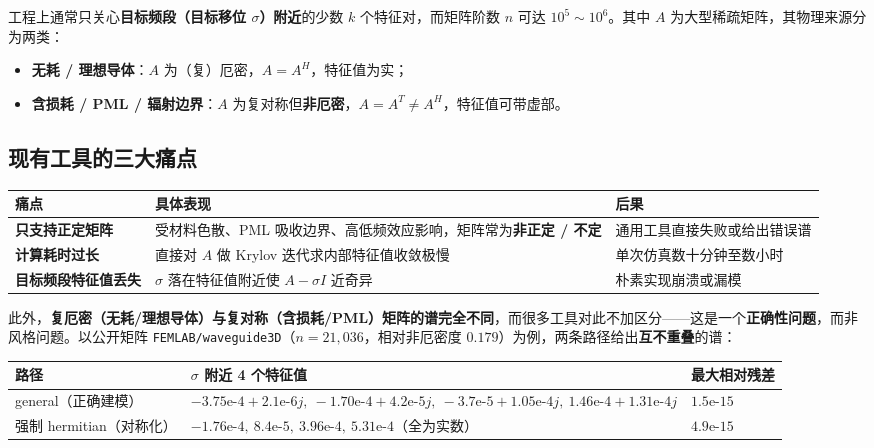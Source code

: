\documentclass[11pt,a4paper]{ctexart}
\newcommand{\code}[1]{\texttt{\small #1}}
\begin{document}
工程上通常只关心\textbf{目标频段（目标移位 $\sigma$）附近}的少数 $k$ 个特征对，而矩阵阶数 $n$ 可达 $10^5 \sim 10^6$。其中 $A$ 为大型稀疏矩阵，其物理来源分为两类：

\begin{itemize}
  \item \textbf{无耗 / 理想导体}：$A$ 为（复）厄密，$A = A^{H}$，特征值为实；
  \item \textbf{含损耗 / PML / 辐射边界}：$A$ 为复对称但\textbf{非厄密}，$A = A^{T} \neq A^{H}$，特征值可带虚部。
\end{itemize}

\subsection{现有工具的三大痛点}

\begin{table}[h]
\centering\small
\renewcommand{\arraystretch}{1.25}
\begin{tabularx}{\textwidth}{@{}>{\bfseries}p{3.4cm} X X@{}}
\toprule
痛点 & 具体表现 & 后果 \\
\midrule
只支持正定矩阵 & 受材料色散、PML 吸收边界、高低频效应影响，矩阵常为\textbf{非正定 / 不定} & 通用工具直接失败或给出错误谱 \\
计算耗时过长 & 直接对 $A$ 做 Krylov 迭代求内部特征值收敛极慢 & 单次仿真数十分钟至数小时 \\
目标频段特征值丢失 & $\sigma$ 落在特征值附近使 $A-\sigma I$ 近奇异 & 朴素实现崩溃或漏模 \\
\bottomrule
\end{tabularx}
\end{table}

此外，\textbf{复厄密（无耗/理想导体）与复对称（含损耗/PML）矩阵的谱完全不同}，而很多工具对此不加区分——这是一个\textbf{正确性问题}，而非风格问题。以公开矩阵 \code{FEMLAB/waveguide3D}（$n = 21{,}036$，相对非厄密度 $0.179$）为例，两条路径给出\textbf{互不重叠}的谱：

\begin{table}[h]
\centering\small
\renewcommand{\arraystretch}{1.25}
\begin{tabular}{@{}p{3.0cm} p{9.6cm} p{2.6cm}@{}}
\toprule
路径 & $\sigma$ 附近 4 个特征值 & 最大相对残差 \\
\midrule
general（正确建模） & $-3.75\text{e-}4+2.1\text{e-}6j,\ -1.70\text{e-}4+4.2\text{e-}5j,\ -3.7\text{e-}5+1.05\text{e-}4j,\ 1.46\text{e-}4+1.31\text{e-}4j$ & $1.5\text{e-}15$ \\
强制 hermitian（对称化） & $-1.76\text{e-}4,\ 8.4\text{e-}5,\ 3.96\text{e-}4,\ 5.31\text{e-}4$（全为实数） & $4.9\text{e-}15$ \\
\bottomrule
\end{tabular}
\end{table}
\end{document}
